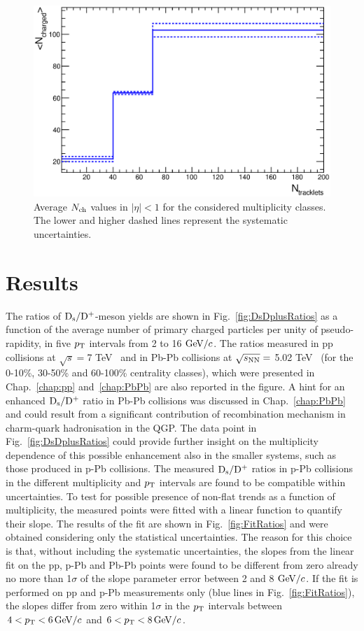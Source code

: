 \begin{figure}[h]
\centering
 \includegraphics[width=.55\textwidth]{FigCap6/AverNchAndTotalSystUnc.eps}
 \caption{Average $N_{\rm ch}$ values in $|\eta|<1$ for the considered multiplicity classes. The lower and higher dashed lines represent the systematic uncertainties.}
 \label{fig:Nch}
\end{figure}

\section{Results}
\label{sec:results}
The ratios of ${\rm D_s}/{\rm D^+}$-meson yields are shown in Fig.~\ref{fig:DsDplusRatios} as a function of
the average number of primary charged particles per unity of pseudo-rapidity, 
in five $p_{\rm T}$ intervals from 2 to 16 $\mathrm{GeV}/c$.
The ratios measured in pp collisions at $\sqrt{s}=$7 TeV~\cite{Acharya:2017jgo} and 
in Pb-Pb collisions at $\sqrt{s_{\rm NN}}=$ 5.02 TeV~\cite{ALICE-PUBLIC-2017-003}
(for the 0-10\%, 30-50\% and 60-100\% centrality classes), which were presented in Chap.~\ref{chap:pp} and~\ref{chap:PbPb} 
are also reported in the figure.
A hint for an enhanced ${\rm D_s}/{\rm D^+}$ ratio in Pb-Pb collisions was discussed in Chap.~\ref{chap:PbPb} and could result
from a significant contribution of recombination mechanism in charm-quark hadronisation in the QGP.
The data point in Fig.~\ref{fig:DsDplusRatios} could provide further insight on the multiplicity 
dependence of this possible enhancement also in the smaller systems, such as those produced
in p-Pb collisions. The measured ${\rm D_s}/{\rm D^+}$ ratios in p-Pb collisions in the different 
multiplicity and $p_{\rm T}$ intervals are found to be compatible within uncertainties. 
To test for possible presence of non-flat trends as a function of multiplicity, the measured points were 
fitted with a linear function to quantify their slope. The results of the fit are shown in Fig.~\ref{fig:FitRatios}
and were obtained considering only the statistical uncertainties. The reason for this choice is that, without including the
systematic uncertainties, the slopes from the linear fit on the pp, 
p-Pb and Pb-Pb points were found to be different from zero already no more than 
1$\sigma$ of the slope parameter error between 2 and 8 $\mathrm{GeV}/c$. 
If the fit is performed on pp and p-Pb measurements only (blue lines in Fig.~\ref{fig:FitRatios}), 
the slopes differ from zero within 1$\sigma$ 
in the $p_{\rm T}$ intervals between $4<p_{\rm T}<6 \, \mathrm{GeV}/c$ and $6<p_{\rm T}<8 \,\mathrm{GeV}/c$. 
 
